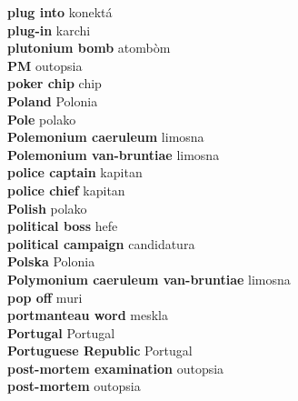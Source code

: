 \textbf{ plug into  } konektá \\
\textbf{ plug-in  } karchi \\
\textbf{ plutonium bomb  } atombòm \\
\textbf{ PM  } outopsia \\
\textbf{ poker chip  } chip \\
\textbf{ Poland  } Polonia \\
\textbf{ Pole  } polako \\
\textbf{ Polemonium caeruleum  } limosna \\
\textbf{ Polemonium van-bruntiae  } limosna \\
\textbf{ police captain  } kapitan \\
\textbf{ police chief  } kapitan \\
\textbf{ Polish  } polako \\
\textbf{ political boss  } hefe \\
\textbf{ political campaign  } candidatura \\
\textbf{ Polska  } Polonia \\
\textbf{ Polymonium caeruleum van-bruntiae  } limosna \\
\textbf{ pop off  } muri \\
\textbf{ portmanteau word  } meskla \\
\textbf{ Portugal  } Portugal \\
\textbf{ Portuguese Republic  } Portugal \\
\textbf{ post-mortem examination  } outopsia \\
\textbf{ post-mortem  } outopsia \\
